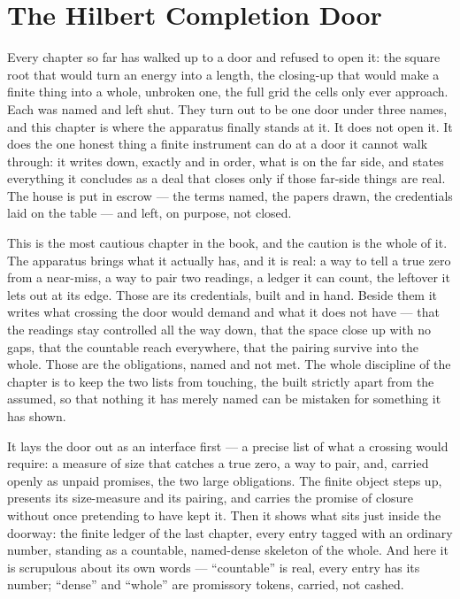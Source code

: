 \chapter{The Hilbert Completion Door}

Every chapter so far has walked up to a door and refused to open it: the square root that would turn an energy into a length, the closing-up that would make a finite thing into a whole, unbroken one, the full grid the cells only ever approach. Each was named and left shut. They turn out to be one door under three names, and this chapter is where the apparatus finally stands at it. It does not open it. It does the one honest thing a finite instrument can do at a door it cannot walk through: it writes down, exactly and in order, what is on the far side, and states everything it concludes as a deal that closes only if those far-side things are real. The house is put in escrow --- the terms named, the papers drawn, the credentials laid on the table --- and left, on purpose, not closed.

This is the most cautious chapter in the book, and the caution is the whole of it. The apparatus brings what it actually has, and it is real: a way to tell a true zero from a near-miss, a way to pair two readings, a ledger it can count, the leftover it lets out at its edge. Those are its credentials, built and in hand. Beside them it writes what crossing the door would demand and what it does not have --- that the readings stay controlled all the way down, that the space close up with no gaps, that the countable reach everywhere, that the pairing survive into the whole. Those are the obligations, named and not met. The whole discipline of the chapter is to keep the two lists from touching, the built strictly apart from the assumed, so that nothing it has merely named can be mistaken for something it has shown.

It lays the door out as an interface first --- a precise list of what a crossing would require: a measure of size that catches a true zero, a way to pair, and, carried openly as unpaid promises, the two large obligations. The finite object steps up, presents its size-measure and its pairing, and carries the promise of closure without once pretending to have kept it. Then it shows what sits just inside the doorway: the finite ledger of the last chapter, every entry tagged with an ordinary number, standing as a countable, named-dense skeleton of the whole. And here it is scrupulous about its own words --- ``countable'' is real, every entry has its number; ``dense'' and ``whole'' are promissory tokens, carried, not cashed.

